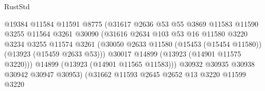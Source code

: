 \begin{lexlean}{RustStd}
\begin{coremodule}
                                          @19384
                                          @11584
                                          @11591
                                          @8775
                                          (@31617
                                            @2636
                                            @53
                                            @55
                                            @3869
                                            @11583
                                            @11590
                                            @3255
                                            @11564
                                            @3261
                                            @30090
                                            (@31616
                                              @2634
                                              @103
                                              @53
                                              @16
                                              @11580
                                              @3220
                                              @3234
                                              @3255
                                              @11574
                                              @3261
                                              (@30050
                                                @2633
                                                @11580
                                                (@15453 (@15454 @11580))
                                                (@13923 (@15459 @2633 @53)))
                                              @30017
                                              @14899
                                              (@13923 (@14901 @11575 @3220)))
                                            @14899
                                            (@13923 (@14901 @11565 @11583)))
                                          @30932
                                          @30935
                                          @30938
                                          @30942
                                          @30947
                                          @30953)
                                        (@31662
                                          @11593
                                          @2645
                                          @2652
                                          @13
                                          @3220
                                          @11599
                                          @3220

\end{coremodule}
\end{lexlean}
